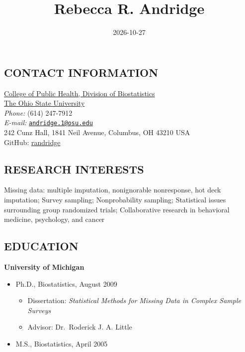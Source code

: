 \documentclass[
  english,
  letterpaper,
  DIV=11,
  numbers=noendperiod]{scrartcl}
\title{Rebecca R. Andridge}
\author{}
\date{2026-10-27}
\providecommand{\tightlist}{%
  \setlength{\itemsep}{0pt}\setlength{\parskip}{0pt}}
\begin{document}
\maketitle


\subsection*{CONTACT INFORMATION}\label{contact-information}

\href{https://cph.osu.edu/people/randridge}{College of Public Health,
Division of Biostatistics}\\
\href{http://www.osu.edu/}{The Ohio State University}\\
\emph{Phone:} (614) 247-7912\\
\emph{E-mail:}
\href{mailto:andridge.1@osu.edu}{\nolinkurl{andridge.1@osu.edu}}\\
242 Cunz Hall, 1841 Neil Avenue, Columbus, OH 43210 USA\\
GitHub: \href{https://github.com/randridge}{randridge}\\

\subsection{RESEARCH INTERESTS}\label{research-interests}

Missing data: multiple imputation, nonignorable nonresponse, hot deck
imputation; Survey sampling; Nonprobability sampling; Statistical issues
surrounding group randomized trials; Collaborative research in
behavioral medicine, psychology, and cancer

\subsection{EDUCATION}\label{education}

\textbf{University of Michigan}

\begin{itemize}
\tightlist
\item
  Ph.D., Biostatistics, August 2009

  \begin{itemize}
  \tightlist
  \item
    Dissertation: \emph{Statistical Methods for Missing Data in Complex
    Sample Surveys}
  \item
    Advisor: Dr.~Roderick J. A. Little
  \end{itemize}
\item
  M.S., Biostatistics, April 2005
\end{itemize}
\end{document}
